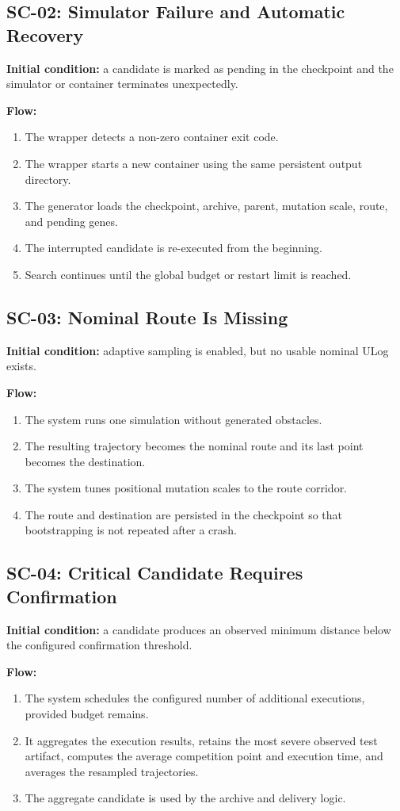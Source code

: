\documentclass[11pt,a4paper,openany]{report}
\begin{document}
\subsection{SC-02: Simulator Failure and Automatic Recovery}
\textbf{Initial condition:} a candidate is marked as pending in the checkpoint and the simulator or container terminates unexpectedly.

\textbf{Flow:}
\begin{enumerate}
  \item The wrapper detects a non-zero container exit code.
  \item The wrapper starts a new container using the same persistent output directory.
  \item The generator loads the checkpoint, archive, parent, mutation scale, route, and pending genes.
  \item The interrupted candidate is re-executed from the beginning.
  \item Search continues until the global budget or restart limit is reached.
\end{enumerate}

\subsection{SC-03: Nominal Route Is Missing}
\textbf{Initial condition:} adaptive sampling is enabled, but no usable nominal ULog exists.

\textbf{Flow:}
\begin{enumerate}
  \item The system runs one simulation without generated obstacles.
  \item The resulting trajectory becomes the nominal route and its last point becomes the destination.
  \item The system tunes positional mutation scales to the route corridor.
  \item The route and destination are persisted in the checkpoint so that bootstrapping is not repeated after a crash.
\end{enumerate}

\subsection{SC-04: Critical Candidate Requires Confirmation}
\textbf{Initial condition:} a candidate produces an observed minimum distance below the configured confirmation threshold.

\textbf{Flow:}
\begin{enumerate}
  \item The system schedules the configured number of additional executions, provided budget remains.
  \item It aggregates the execution results, retains the most severe observed test artifact, computes the average competition point and execution time, and averages the resampled trajectories.
  \item The aggregate candidate is used by the archive and delivery logic.
\end{enumerate}
\end{document}
